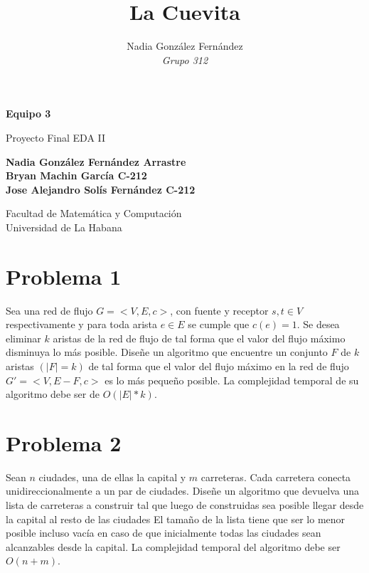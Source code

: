\documentclass[a4paper,10pt]{article}
\title{\textbf{La Cuevita}}
\author{Nadia González Fernández 
	\\\emph{Grupo 312}}
\date{}
\begin{document}
	\begin{titlepage}
		\begin{center}
			\vspace*{1cm}
			\textbf{Equipo 3}
			
			\vspace{0.5cm}
			Proyecto Final EDA II
			
			\vspace{1.5cm}
			\textbf{Nadia González Fernández \textnormal{Arrastre}
				\\Bryan Machin Garc\'ia \textnormal{C-212}
				\\Jose Alejandro Sol\'is Fern\'andez \textnormal{C-212}}
			
			\vspace{5cm}
			Facultad de Matemática y Computación\\
			Universidad de La Habana
			
		\end{center}
	\end{titlepage}

	\section{Problema 1}
	Sea una red de flujo $G = <V,E,c>$, con fuente y receptor $s,t \in V$ respectivamente y para toda arista $e \in E$ se cumple que $c(e) = 1$. Se desea eliminar $k$ aristas de la red de flujo de tal forma que el valor del flujo máximo disminuya lo m\'as posible.
	Dise\~ne un algoritmo que encuentre un conjunto $F$ de $k$ aristas $(|F| = k)$ de 	
	tal forma que el valor del flujo máximo en la red de flujo $G' = <V,E - F,c>$ es lo m\'as peque\~no posible. La complejidad temporal de su algoritmo debe ser de $O(|E|*k)$. 
	\section{Problema 2}
	Sean $n$ ciudades, una de ellas la capital y $m$ carreteras. Cada carretera conecta unidireccionalmente a un par de ciudades. Dise\~ne un algoritmo que devuelva una lista de carreteras a construir tal que luego de construidas sea posible llegar desde la capital al resto de las ciudades El tama\~no de la lista tiene que ser lo menor posible incluso vac\'ia en caso de que inicialmente todas las ciudades sean alcanzables desde la capital. La complejidad temporal del algoritmo debe ser $O(n + m)$.
\end{document}
